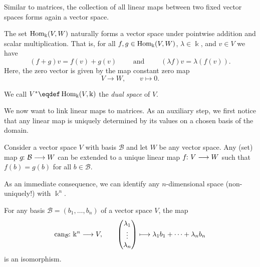 \documentclass[a4paper, oneside, 12pt]{amsart}
\begin{document}
Similar to matrices, the collection of all linear maps between two fixed vector spaces forms again a vector space.

\begin{remark}\label{rmk:vector-space-structure}
  The set \( \operatorname{Hom}_{\Bbbk}(V, W) \) naturally forms a vector space under pointwise addition and scalar multiplication.
  That is, for all \(f, g \in \operatorname{Hom}_{ \Bbbk}(V,W)\), \(\lambda \in \Bbbk\), and \(v\in V\) we have
  \begin{equation*}
    (f+g)v = f(v) + g(v)\qquad \text{ and } \qquad
    (\lambda f)v = \lambda (f (v)).
  \end{equation*}
  Here, the zero vector is given by the map constant zero map
  \begin{equation*}
    V\to W, \qquad v \mapsto 0.
  \end{equation*}
\end{remark}

\begin{definition}\label{def:dual space}
  We call \(\rd*{V} \eqdef \Hom_{ \Bbbk}(V,   \Bbbk )\) the \emph{dual space} of \(V\).
\end{definition}

We now want to link linear maps to matrices.
As an auxiliary step, we first notice that any linear map is uniquely determined by its values on a chosen basis of the domain.

\begin{theorem}\label{thm:universal-property-free-vector-space}
  Consider a vector space \(V\) with basis \( \mathcal{B}\) and let \(W\) be any vector space.
  Any (set) map \(g \from \mathcal{B} \to W\) can be extended to a unique linear map \(f\from V \to W\) such that \(f(b) = g(b)\) for all \(b\in \mathcal{B}\).
\end{theorem}

As an immediate consequence, we can identify any \(n\)-dimensional space (non-uniquely!) with \( \Bbbk^{n}\).

\begin{corollary}\label{cor:basis-isomorphism}
  For any basis \( \mathcal{B} = (b_{1}, \dots , b_{n})\)  of a vector space \(V\), the map
  \begin{equation}
    \can_{\mathcal{B}} \from
    \Bbbk^{n} \to V, \qquad
    \begin{pmatrix}
      \lambda_{1}\\ \vdots \\ \lambda_{n}
    \end{pmatrix}
    \mapsto
    \lambda_{1} b_{1} + \dots + \lambda_{n} b_{n}
  \end{equation}
  is an isomorphism.
\end{corollary}
\end{document}
